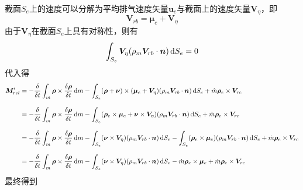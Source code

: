 截面$S_e$上的速度可以分解为平均排气速度矢量$\bm{u}_e$与截面上的速度矢量$\bm{V}_\eta$，即
\begin{equation}
	\bm{V}_{rb} = \bm{\mu}_e + \bm{V}_{\eta}
\end{equation}
由于$\bm{V}_\eta$在截面$S_e$上具有对称性，则有
\begin{equation}
	\int_{S_e} \bm{V}_\eta (\rho_m \bm{V}_{rb}\cdot \bm{n}) \, {\rm{d}} S_e = 0
\end{equation}
代入得
\begin{align*}
	\bm{M}'_{rel} & = - \dfrac{\delta }{\delta t} \int_m \bm{\rho} \times \dfrac{\delta \bm{\rho}}{\delta t} \, {\rm{d}} m  - \int_{S_e}  (\bm{\rho} + \bm{\nu}) \times ( \bm{\mu}_e + \bm{V}_{\eta}) (\rho_m \bm{V}_{rb}\cdot \bm{n}) \, {\rm{d}} S_e +\dot{m} \bm{\rho}_e \times \bm{V}_{rc} \\[0.8em]
	& = - \dfrac{\delta }{\delta t} \int_m \bm{\rho} \times \dfrac{\delta \bm{\rho}}{\delta t} \, {\rm{d}} m  - \int_{S_e} (\bm{\rho}_e \times \bm{\mu}_e + \bm{\nu} \times \bm{V}_\eta) (\rho_m \bm{V}_{rb}\cdot \bm{n}) \, {\rm{d}} S_e +\dot{m} \bm{\rho}_e \times \bm{V}_{rc} \\[0.8em]
	& = - \dfrac{\delta }{\delta t} \int_m \bm{\rho} \times \dfrac{\delta \bm{\rho}}{\delta t} \, {\rm{d}} m  - \int_{S_e}  (\bm{\nu} \times \bm{V}_\eta) (\rho_m \bm{V}_{rb}\cdot \bm{n}) \, {\rm{d}} S_e - \int_{S_e}( \bm{\rho}_e \times \bm{\mu}_e)(\rho_m \bm{V}_{rb}\cdot \bm{n}) \, {\rm{d}} S_e  + \dot{m} \bm{\rho}_e \times \bm{V}_{rc} \\[0.8em]
	& = - \dfrac{\delta }{\delta t} \int_m \bm{\rho} \times \dfrac{\delta \bm{\rho}}{\delta t} \, {\rm{d}} m  - \int_{S_e}  (\bm{\nu} \times \bm{V}_\eta) (\rho_m \bm{V}_{rb}\cdot \bm{n}) \, {\rm{d}} S_e - \dot{m} \bm{\rho}_e \times \bm{\mu}_e  + \dot{m} \bm{\rho}_e \times \bm{V}_{rc}
\end{align*}
最终得到



